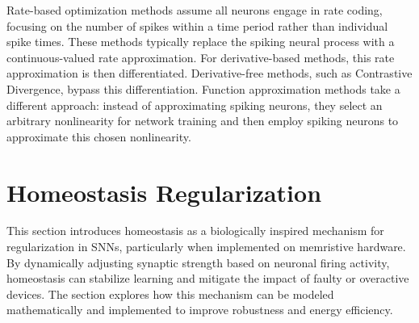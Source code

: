 

\noindent Rate-based optimization methods assume all neurons engage in rate coding, focusing on the number of spikes within a time period rather than individual spike times. These methods typically replace the spiking neural process with a continuous-valued rate approximation. For derivative-based methods, this rate approximation is then differentiated. Derivative-free methods, such as Contrastive Divergence, bypass this differentiation. Function approximation methods take a different approach: instead of approximating spiking neurons, they select an arbitrary nonlinearity for network training and then employ spiking neurons to approximate this chosen nonlinearity.

\section[Homeostasis Regularization]{Homeostasis Regularization}


This section introduces homeostasis as a biologically inspired mechanism for regularization in SNNs, particularly when implemented on memristive hardware. By dynamically adjusting synaptic strength based on neuronal firing activity, homeostasis can stabilize learning and mitigate the impact of faulty or overactive devices. The section explores how this mechanism can be modeled mathematically and implemented to improve robustness and energy efficiency.

